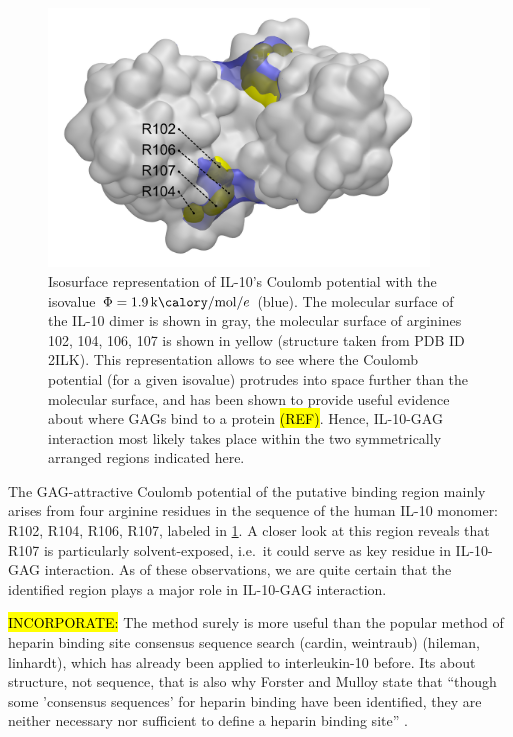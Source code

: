 \begin{figure}
\centering
\includegraphics[width=0.9\textwidth]{gfx/bspred/SI_figure_IL-10_coulomb_isosurface_1_9kcalmol.png}
\caption[]{
Isosurface representation of IL-10's Coulomb potential with the isovalue $\Phi =
\SI{1.9}{\kilo\calory\per\mole\per\elementarycharge}$ (blue). The molecular
surface of the IL-10 dimer is shown in gray, the molecular surface of arginines
102, 104, 106, 107 is shown in yellow (structure taken from PDB ID 2ILK). This
representation allows to see where the Coulomb potential (for a given isovalue)
protrudes into space further than the molecular surface, and has been shown to
provide useful evidence about where GAGs bind to a protein \hl{(REF)}. Hence,
IL-10-GAG interaction most likely takes place within the two symmetrically
arranged regions indicated here.
}
\label{fig:bspred:il10_estatic_pred}
\end{figure}

The GAG-attractive Coulomb potential of the putative binding region mainly
arises from four arginine residues in the sequence of the human IL-10 monomer:
R102, R104, R106, R107, labeled in \cref{fig:bspred:il10_estatic_pred}. A closer
look at this region reveals that R107 is particularly solvent-exposed, i.e.\ it
could serve as key residue in IL-10-GAG interaction. As of these observations,
we are quite certain that the identified region plays a major role in IL-10-GAG
interaction.



\hl{INCORPORATE:} The method surely is more useful than the popular method of
heparin binding site consensus sequence search (cardin, weintraub) (hileman,
linhardt), which has already been applied to interleukin-10 before. Its about
structure, not sequence, that is also why Forster and Mulloy state that
\enquote{though some 'consensus sequences' for heparin binding have been
identified, they are neither necessary nor sufficient to define a heparin
binding site} \cite{hp_binding_sites_mulloy_2006}.





